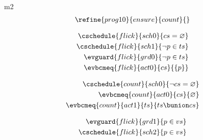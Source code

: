 \documentclass{article}
\begin{document}
\begin{machine}{m2}
\begin{align*}
	\refine{prog10}{ensure}{count}{} %
\end{align*}



\begin{align}
	\cschedule{flick}{sch0}{ cs = \emptyset } \\
	\cschedule{flick}{sch1}{ \neg p \in ts } \\
	\evguard{flick}{grd0}{ \neg p \in ts } \\
	\evbcmeq{flick}{act0}{cs}{ \{ p \} }
\end{align}






\begin{align}
	\cschedule{count}{sch0}{ \neg cs = \emptyset } \\
	\evbcmeq{count}{act0}{cs}{\emptyset} \\
	\evbcmeq{count}{act1}{ts}{ ts \bunion cs }
\end{align}




\begin{align*}
	\evguard{flick}{grd1}{p \in vs} \\
	\cschedule{flick}{sch2}{p \in vs}
\end{align*}



\end{machine}
\end{document}
